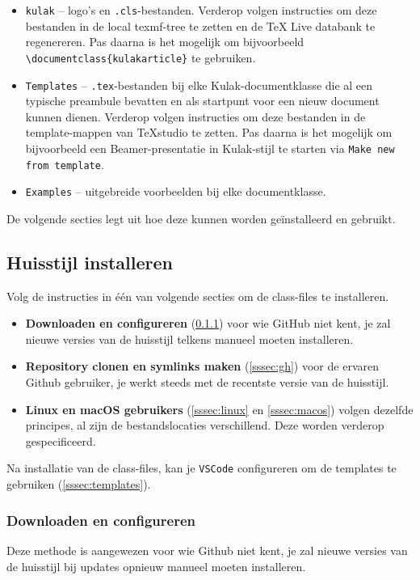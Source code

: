 \documentclass[kulak]{kulakarticle} %
\begin{document}
\begin{itemize}
	\item \texttt{kulak} -- logo's en \texttt{.cls}-bestanden. Verderop volgen instructies om deze bestanden in de local texmf-tree te zetten en de TeX Live databank te regenereren. Pas daarna is het mogelijk om bijvoorbeeld \verb+\documentclass{kulakarticle}+ te gebruiken.
	\item \texttt{Templates}  -- \texttt{.tex}-bestanden bij elke Kulak-documentklasse die al een typische preambule bevatten en als startpunt voor een nieuw document kunnen dienen. Verderop volgen instructies om deze bestanden in de  template-mappen van TeXstudio te zetten. Pas daarna is het mogelijk om bijvoorbeeld een Beamer-presentatie in Kulak-stijl te starten via \texttt{Make new from template}.
	\item \texttt{Examples} -- uitgebreide voorbeelden bij elke documentklasse.
\end{itemize}
De volgende secties legt uit hoe deze kunnen worden geïnstalleerd en gebruikt.

\subsection{Huisstijl installeren}
Volg de instructies in één van volgende secties om de class-files te installeren.
\begin{itemize}
	\item \textbf{Downloaden en configureren} (\ref{sssec:dl}) voor wie GitHub niet kent, je zal nieuwe versies van de huisstijl telkens manueel moeten installeren.
	\item \textbf{Repository clonen en symlinks maken} (\ref{sssec:gh}) voor de ervaren Github gebruiker, je werkt steeds met de recentste versie van de huisstijl.
	\item \textbf{Linux en macOS gebruikers} (\ref{sssec:linux} en \ref{sssec:macos}) volgen dezelfde principes, al zijn de bestandslocaties verschillend. Deze worden verderop gespecificeerd.
\end{itemize}
Na installatie van de class-files, kan je \texttt{VSCode} configureren om de templates te gebruiken (\ref{sssec:templates}).

\subsubsection{Downloaden en configureren}
\label{sssec:dl}
Deze methode is aangewezen voor wie Github niet kent, je zal nieuwe versies van de huisstijl bij updates opnieuw manueel moeten installeren.
\end{document}
